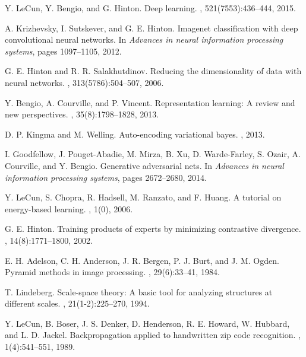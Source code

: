 \documentclass[12pt,a4paper]{article}
\begin{document}

\begin{thebibliography}{20}

Y. LeCun, Y. Bengio, and G. Hinton.
\newblock Deep learning.
, 521(7553):436--444, 2015.

A. Krizhevsky, I. Sutskever, and G. E. Hinton.
\newblock Imagenet classification with deep convolutional neural networks.
\newblock In {\em Advances in neural information processing systems}, pages 1097--1105, 2012.

G. E. Hinton and R. R. Salakhutdinov.
\newblock Reducing the dimensionality of data with neural networks.
, 313(5786):504--507, 2006.

Y. Bengio, A. Courville, and P. Vincent.
\newblock Representation learning: A review and new perspectives.
, 35(8):1798--1828, 2013.

D. P. Kingma and M. Welling.
\newblock Auto-encoding variational bayes.
, 2013.

I. Goodfellow, J. Pouget-Abadie, M. Mirza, B. Xu, D. Warde-Farley, S. Ozair, A. Courville, and Y. Bengio.
\newblock Generative adversarial nets.
\newblock In {\em Advances in neural information processing systems}, pages 2672--2680, 2014.

Y. LeCun, S. Chopra, R. Hadsell, M. Ranzato, and F. Huang.
\newblock A tutorial on energy-based learning.
, 1(0), 2006.

G. E. Hinton.
\newblock Training products of experts by minimizing contrastive divergence.
, 14(8):1771--1800, 2002.

E. H. Adelson, C. H. Anderson, J. R. Bergen, P. J. Burt, and J. M. Ogden.
\newblock Pyramid methods in image processing.
, 29(6):33--41, 1984.

T. Lindeberg.
\newblock Scale-space theory: A basic tool for analyzing structures at different scales.
, 21(1-2):225--270, 1994.

Y. LeCun, B. Boser, J. S. Denker, D. Henderson, R. E. Howard, W. Hubbard, and L. D. Jackel.
\newblock Backpropagation applied to handwritten zip code recognition.
, 1(4):541--551, 1989.


\end{thebibliography}
\end{document}
